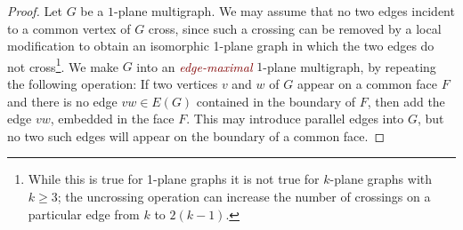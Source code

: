 \documentclass{patmorin}
\theoremstyle{plain}
\theoremstyle{definition}
\newcommand{\defin}[1]{\textcolor{Maroon}{\emph{#1}}}
\renewcommand{\ge}{\geqslant}
\begin{document}
\begin{proof}
Let $G$ be a $1$-plane multigraph. We may assume that no two edges incident to a common vertex of $G$ cross, since such a crossing can be removed by a local modification to obtain an isomorphic 1-plane graph in which the two edges do not cross\footnote{While this is true for 1-plane graphs it is not true for $k$-plane graphs with $k\ge 3$; the uncrossing operation can increase the number of crossings on a particular edge from $k$ to $2(k-1)$.}.
We make $G$ into an \defin{edge-maximal} $1$-plane multigraph, by repeating the following operation:  If two vertices $v$ and $w$ of $G$ appear on a common face $F$ and there is no edge $vw\in E(G)$ contained in the boundary of $F$, then add the edge $vw$, embedded in the face $F$.  This may introduce parallel edges into $G$, but no two such edges will appear on the boundary of a common face.


\end{proof}
\end{document}
